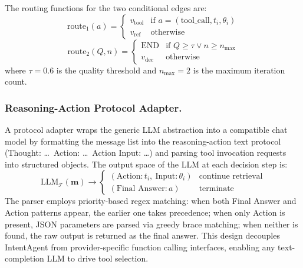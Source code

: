 \documentclass[runningheads]{llncs}
\begin{document}
The routing functions for the two conditional edges are:
\begin{equation}
    \text{route}_1(a) = \begin{cases}
    v_{\text{tool}} & \text{if } a = (\text{tool\_call}, t_i, \theta_i) \\
    v_{\text{ref}} & \text{otherwise}
    \end{cases}
\end{equation}
\begin{equation}
    \text{route}_2(Q, n) = \begin{cases}
    \text{END} & \text{if } Q \geq \tau \vee n \geq n_{\max} \\
    v_{\text{dec}} & \text{otherwise}
    \end{cases}
\end{equation}
where $\tau = 0.6$ is the quality threshold and $n_{\max} = 2$ is the maximum iteration count.

\subsubsection{Reasoning-Action Protocol Adapter.}

A protocol adapter wraps the generic LLM abstraction into a compatible chat model by formatting the message list into the reasoning-action text protocol (Thought: \ldots\ Action: \ldots\ Action Input: \ldots) and parsing tool invocation requests into structured objects. The output space of the LLM at each decision step is:
\begin{equation}
    \text{LLM}_{\mathcal{T}}(\mathbf{m}) \to \begin{cases}
    (\text{Action}: t_i,\ \text{Input}: \theta_i) & \text{continue retrieval} \\
    (\text{Final Answer}: a) & \text{terminate}
    \end{cases}
\end{equation}
The parser employs priority-based regex matching: when both Final Answer and Action patterns appear, the earlier one takes precedence; when only Action is present, JSON parameters are parsed via greedy brace matching; when neither is found, the raw output is returned as the final answer. This design decouples IntentAgent from provider-specific function calling interfaces, enabling any text-completion LLM to drive tool selection.
\end{document}
